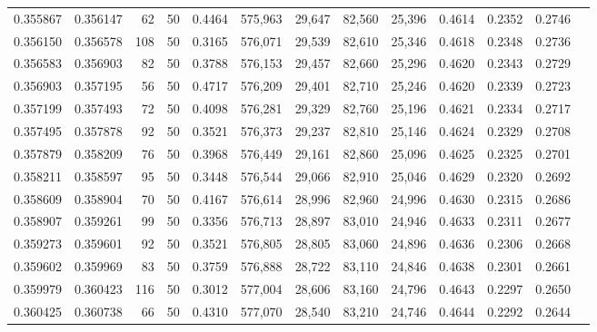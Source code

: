 \begin{tabular}{rrrrrrrrrrrrr}
0.355867 & 0.356147 &    62 &  50 &                                     0.4464 & 575,963 &  29,647 &  82,560 &  25,396 & 0.4614 & 0.2352 & 0.2746 \\
0.356150 & 0.356578 &   108 &  50 &                                     0.3165 & 576,071 &  29,539 &  82,610 &  25,346 & 0.4618 & 0.2348 & 0.2736 \\
0.356583 & 0.356903 &    82 &  50 &                                     0.3788 & 576,153 &  29,457 &  82,660 &  25,296 & 0.4620 & 0.2343 & 0.2729 \\
0.356903 & 0.357195 &    56 &  50 &                                     0.4717 & 576,209 &  29,401 &  82,710 &  25,246 & 0.4620 & 0.2339 & 0.2723 \\
0.357199 & 0.357493 &    72 &  50 &                                     0.4098 & 576,281 &  29,329 &  82,760 &  25,196 & 0.4621 & 0.2334 & 0.2717 \\
0.357495 & 0.357878 &    92 &  50 &                                     0.3521 & 576,373 &  29,237 &  82,810 &  25,146 & 0.4624 & 0.2329 & 0.2708 \\
0.357879 & 0.358209 &    76 &  50 &                                     0.3968 & 576,449 &  29,161 &  82,860 &  25,096 & 0.4625 & 0.2325 & 0.2701 \\
0.358211 & 0.358597 &    95 &  50 &                                     0.3448 & 576,544 &  29,066 &  82,910 &  25,046 & 0.4629 & 0.2320 & 0.2692 \\
0.358609 & 0.358904 &    70 &  50 &                                     0.4167 & 576,614 &  28,996 &  82,960 &  24,996 & 0.4630 & 0.2315 & 0.2686 \\
0.358907 & 0.359261 &    99 &  50 &                                     0.3356 & 576,713 &  28,897 &  83,010 &  24,946 & 0.4633 & 0.2311 & 0.2677 \\
0.359273 & 0.359601 &    92 &  50 &                                     0.3521 & 576,805 &  28,805 &  83,060 &  24,896 & 0.4636 & 0.2306 & 0.2668 \\
0.359602 & 0.359969 &    83 &  50 &                                     0.3759 & 576,888 &  28,722 &  83,110 &  24,846 & 0.4638 & 0.2301 & 0.2661 \\
0.359979 & 0.360423 &   116 &  50 &                                     0.3012 & 577,004 &  28,606 &  83,160 &  24,796 & 0.4643 & 0.2297 & 0.2650 \\
0.360425 & 0.360738 &    66 &  50 &                                     0.4310 & 577,070 &  28,540 &  83,210 &  24,746 & 0.4644 & 0.2292 & 0.2644 \\

\end{tabular}
